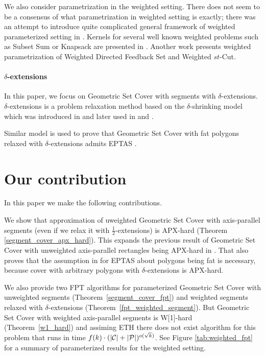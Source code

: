 We also consider parametrization in the weighted setting.
There does not seem to be a consensus of what parametrization
in weighted setting is exactly; there
was an attempt to introduce quite complicated general
framework of weighted parameterized setting in \cite{weighted_framework}.
Kernels for several well known weighted problems
such as Subset Sum or Knapsack are presented in \cite{kernel_weighted}.
Another work \cite{weighted_flow} presents weighted
parametrization of Weighted Directed Feedback Set and Weighted $st$-Cut.

\paragraph{$\delta$-extensions}
In this paper, we focus on Geometric Set Cover with segments with $\delta$-extensions.
$\delta$-extensions is a problem relaxation method based on the
$\delta$-shrinking model which was introduced in \cite{shrinking_original}
and later used in \cite{shrinking1} and \cite{shrinking2}.

Similar model is used to prove that Geometric Set Cover with fat polygons
relaxed with $\delta$-extensions admits EPTAS \cite{harpeled12}.

\section*{Our contribution}
In this paper we make the following contributions.

We show that approximation of uweighted Geometric Set Cover with axis-parallel segments
(even if we relax it with  $\frac{1}{2}$-extensions) is APX-hard
(Theorem \ref{segment_cover_apx_hard}).
This expands the previous result of Geometric Set Cover
with unweighted axis-parallel rectangles being APX-hard in \cite{rectangles_apx_hard}.
That also proves that the assumption in \cite{harpeled12}
for EPTAS about polygons being fat is necessary, because
cover with arbitrary polygons with $\delta$-extensions is APX-hard.

We also provide two FPT algorithms for parameterized Geometric Set Cover 	
with unweighted segments (Theorem~\ref{segment_cover_fpt})
and weighted segments relaxed with $\delta$-extensions
(Theorem~\ref{fpt_weighted_segment}).
But Geometric Set Cover with weighted
axis-parallel segments is W[1]-hard (Theorem~\ref{w1_hard})
and assiming ETH there does not exist algorithm for this problem
that runs in time $f(k)\cdot(|\mathcal{C}| + |\mathcal{P}|)^{o(\sqrt{k})}$.
See Figure \ref{tab:weighted_fpt} for a summary of parameterized
results for the weighted setting.

